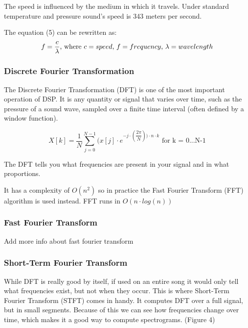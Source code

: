 The speed is influenced by the medium in which it travels. Under standard temperature and pressure sound's speed is 343 meters per second. \cite{speed_of_sound}

The equation (5) can be rewritten as:
\begin{equation}
f = \dfrac{c}{\lambda} \textnormal{, where $c=speed$, $f=frequency$, $\lambda=wavelength$}
\end{equation}


\subsubsection{Discrete Fourier Transformation}
The Discrete Fourier Transformation (DFT) is one of the most important operation of DSP. It is any quantity or signal that varies over time, such as the pressure of a sound wave, sampled over a finite time interval (often defined by a window function). \cite{discrete} \par

\begin{equation}
X[k] = \dfrac{1}{N} \sum_{j=0}^{N-1}(x[j] \cdot e^ {-j \cdot( \dfrac{2\pi}{N}) ) \cdot n \cdot k }  \text{ for k = 0...N-1}
\end{equation}

The DFT tells you what frequencies are present in your signal and in what proportions.
\par
It has a complexity of $O(n^2)$ so in practice the Fast Fourier Transform (FFT) algorithm is used instead. FFT runs in $O(n\cdot log(n))$

\subsubsection{Fast Fourier Transform}
Add more info about fast fourier transform

\subsubsection{Short-Term Fourier Transform}
While DFT is really good by itself, if used on an entire song it would only tell what frequencies exist, but not when they occur. This is where Short-Term Fourier Transform (STFT) comes in handy. It computes DFT over a full signal, but in small segments. Because of this we can see how frequencies change over time, which makes it a good way to compute spectrograms. (Figure 4) 

